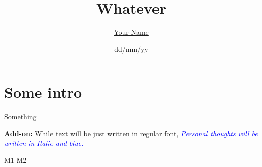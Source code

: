 \documentclass[a4paper,12pt]{article}
\begin{document}
\author{\hyperlink{youremail@gmail.com}{Your Name}} %
\title{Whatever} %
\date{dd/mm/yy} %
\maketitle %
\setcounter{tocdepth}{2} %
\tableofcontents
\newpage

\section*{Some intro}

Something

\textbf{Add-on:} While text will be just written in regular font, \textit{\textcolor{blue}{Personal thoughts will be written in Italic and blue.}}



\newpage


{M1}
{M2}
\end{document}
